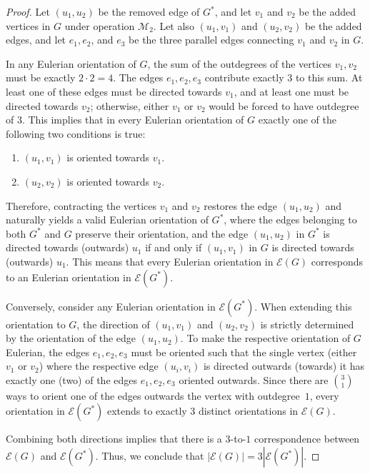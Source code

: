 \documentclass{article}
\begin{document}
        \begin{proof}
            Let $(u_1,u_2)$ be the removed edge of $G^*$, and let $v_1$ and $v_2$ be the added vertices in $G$ under operation $\mathcal{M}_2$. 
            Let also $(u_1,v_1)$ and $(u_2,v_2)$ be the added edges, and let $e_1, e_2$, and $e_3$ be the three parallel edges connecting $v_1$ and $v_2$ in $G$. 
            
            In any Eulerian orientation of $G$, the sum of the outdegrees of the vertices $v_1, v_2$  must be exactly $2 \cdot 2 = 4$. 
            The edges $e_1, e_2, e_3$ contribute exactly $3$ to this sum. 
            At least one of these edges must be directed towards $v_1$, and at least one must be directed towards $v_2$; otherwise, either $v_1$ or $v_2$ would be forced to have outdegree of $3$.
            This implies that in every Eulerian orientation of $G$ exactly one of the following two conditions is true:
         \begin{enumerate}
             \item $(u_1,v_1)$ is oriented towards $v_1$.
             \item $(u_2,v_2)$ is oriented towards $v_2$.
        \end{enumerate}
            Therefore, contracting the vertices $v_1$ and $v_2$ restores the edge $(u_1,u_2)$ and naturally yields a valid Eulerian orientation of $G^*$, where the edges belonging to both $G^*$ and $G$ preserve their orientation, and the edge $(u_1,u_2)$ in $G^*$ is directed towards (outwards) $u_1$ if and only if $(u_1,v_1)$ in $G$ is directed towards (outwards) $u_1$.
            This means that every Eulerian orientation in $\mathcal{E}(G)$ corresponds to an Eulerian orientation in $\mathcal{E}(G^*)$.
            
            Conversely, consider any Eulerian orientation in $\mathcal{E}(G^*)$.  
            When extending this orientation to $G$, the direction of $(u_1, v_1)$ and $(u_2,v_2)$ is strictly determined by the orientation of the edge $(u_1,u_2)$. 
            To make the respective orientation of $G$ Eulerian, the  edges $e_1, e_2, e_3$ must be oriented such that the single vertex (either $v_1$ or $v_2$) where the respective edge  $(u_i,v_i)$ is directed outwards (towards) it has exactly one (two) of the edges $e_1, e_2, e_3$ oriented outwards. 
            Since there are $\binom{3}{1}$ ways to orient one of the edges outwards the vertex with outdegree~$1$, every orientation in $\mathcal{E}(G^*)$ extends to exactly $3$ distinct orientations in $\mathcal{E}(G)$.
            
            Combining both directions implies that there is a $3$-to-$1$ correspondence between $\mathcal{E}(G)$ and $\mathcal{E}(G^*)$. 
            Thus, we conclude that $|\mathcal{E}(G)| = 3|\mathcal{E}(G^*)|$.
        \end{proof}
\end{document}
